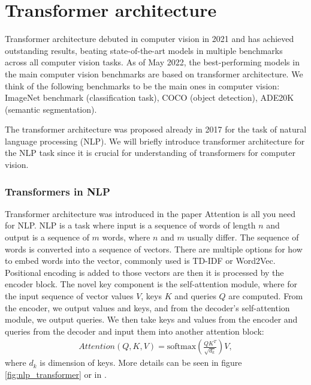 \section{Transformer architecture}
Transformer architecture debuted in computer vision in 2021 and has achieved outstanding results, beating state-of-the-art models in multiple benchmarks across all computer vision tasks. As of May 2022, the best-performing models in the main computer vision benchmarks are based on transformer architecture. We think of the following benchmarks to be the main ones in computer vision:  ImageNet benchmark (classification task), COCO (object detection), ADE20K (semantic segmentation).

The transformer architecture was proposed already in 2017 for the task of natural language processing (NLP). We will briefly introduce transformer architecture for the NLP task since it is crucial for understanding of transformers for computer vision.

\subsubsection{Transformers in NLP}
Transformer architecture was introduced in the paper Attention is all you need \cite{Vaswani2017} for NLP. NLP is a task where input is a sequence of words of length $n$ and output is a sequence of $m$ words, where $n$ and $m$ usually differ. The sequence of words is converted into a sequence of vectors. There are multiple options for how to embed words into the vector, commonly used is TD-IDF or Word2Vec\cite{Li2018}. Positional encoding is added to those vectors are then it is processed by the encoder block. The novel key component is the self-attention module, where for the input sequence of vector values $V$, keys $K$ and queries $Q$ are computed. From the encoder, we output values and keys, and from the decoder's self-attention module, we output queries. We then take keys and values from the encoder and queries from the decoder and input them into another attention block:
\begin{align}
    Attention \left(Q,K,V \right) = \text{softmax} \left( \frac{QK^T}{\sqrt{d_k}} \right)V,
\end{align}
where $d_k$ is dimension of keys. More details can be seen in figure \ref{fig:nlp_transformer} or in \cite{Vaswani2017}.

